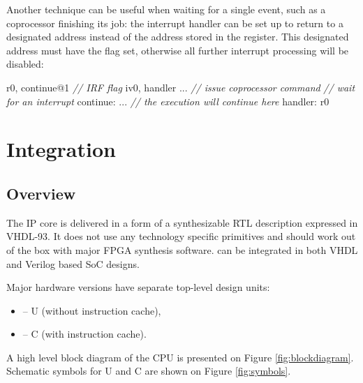 \documentclass[a4paper,12pt,twoside,extrafontsizes]{memoir}
\begin{document}
Another technique can be useful when waiting for a single event, such as a coprocessor finishing its job: the interrupt handler can be set up to return to a designated address instead of the address stored in the  register. This designated address must have the  flag set, otherwise all further interrupt processing will be disabled:

\begin{codepar}
     r0, continue@1 \emph{// IRF flag}
     iv0, handler
    ... \emph{// issue coprocessor command}
     \emph{// wait for an interrupt}
continue:
    ... \emph{// the execution will continue here}
handler:
     r0
\end{codepar}

\chapter{Integration}
\label{ch:integration}

\section{Overview}

The \lxp{} IP core is delivered in a form of a synthesizable RTL description expressed in \mbox{VHDL-93}. It does not use any technology specific primitives and should work out of the box with major FPGA synthesis software. \lxp{} can be integrated in both VHDL and Verilog\textregistered{} based SoC designs.

Major \lxp{} hardware versions have separate top-level design units:

\begin{itemize}
	\item {} -- \lxp{}U (without instruction cache),
	\item {} -- \lxp{}C (with instruction cache).
\end{itemize}

A high level block diagram of the CPU is presented on Figure \ref{fig:blockdiagram}. Schematic symbols for \lxp{}U and \lxp{}C are shown on Figure \ref{fig:symbols}.
\end{document}
